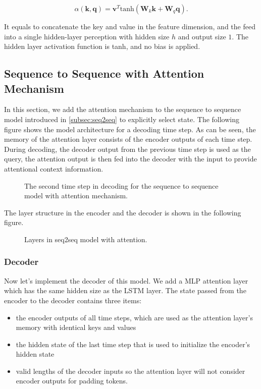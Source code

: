 $$\alpha(\mathbf k, \mathbf q) = \mathbf v^T \text{tanh}(\mathbf W_k \mathbf k + \mathbf W_q\mathbf q). $$

It equals to concatenate the key and value in the feature dimension, and the feed into a single hidden-layer perception with hidden size $h$ and output size $1$. The hidden layer activation function is tanh, and no bias is applied.

\subsection{Sequence to Sequence with Attention Mechanism}

In this section, we add the attention mechanism to the sequence to sequence
model introduced in \cref{subsec:seq2seq} to explicitly select state. The following figure shows the model architecture for a decoding time step. As can be seen, the memory of the attention layer consists of the encoder outputs of each time step. During decoding, the decoder output from the previous time step is used as the query, the attention output is then fed into the decoder with the input to provide
attentional context information.

\begin{figure}[hpt]
	\centering
	
	\caption{The second time step in decoding for the sequence to sequence model with attention mechanism.}
	\label{fig:seq2seq_attention}
\end{figure}

The layer structure in the encoder and the decoder is shown in the following figure.

\begin{figure}[hpt]
	\centering
	
	\caption{Layers in seq2seq model with attention.}
	\label{fig:seq2seq-attention-details}
\end{figure}

\subsubsection{Decoder}

Now let's implement the decoder of this model. We add a MLP attention layer which has the same hidden size as the LSTM layer. The state passed from the encoder to the decoder contains three items:

\begin{itemize}
    \item the encoder outputs of all time steps, which are used as the attention layer's memory with identical keys and values
    \item the hidden state of the last time step that is used to initialize the encoder's hidden state  
    \item valid lengths of the decoder inputs so the attention layer will not consider encoder outputs for padding tokens.
\end{itemize}

